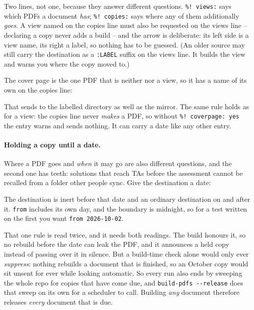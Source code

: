 Two lines, not one, because they answer different questions.
\texttt{\%! views:} says which PDFs a document \emph{has};
\texttt{\%! copies:} says where any of them additionally \emph{goes}. A view
named on the copies line must also be requested on the views line -- declaring a
copy never adds a build -- and the arrow is deliberate: its left side is a view
name, its right a label, so nothing has to be guessed. (An older source may
still carry the destination as a \texttt{:LABEL} suffix on the views line. It
builds the view and warns you where the copy moved to.)

The cover page is the one PDF that is neither  nor a view, so it
has a name of its own on the copies line:

\begin{manexsource}
\end{manexsource}

\noindent That sends  to the labelled directory as
well as the mirror. The same rule holds as for a view: the copies line never
\emph{makes} a PDF, so without \texttt{\%! coverpage: yes} the entry warns and
sends nothing. It can carry a date like any other entry.

\paragraph{Holding a copy until a date.}
Where a PDF goes and \emph{when} it may go are also different questions, and the
second one has teeth: solutions that reach TAs before the assessment cannot be
recalled from a folder other people sync. Give the destination a date:

\begin{manexsource}
\end{manexsource}

\noindent The destination is inert before that date and an ordinary destination
on and after it. \texttt{from} includes its own day, and the boundary is
midnight, so for a test written on the first you want \texttt{from 2026-10-02}.

That one rule is read twice, and it needs both readings. The build honours it,
so no rebuild before the date can leak the PDF, and it announces a held copy
instead of passing over it in silence. But a build-time check alone would only
ever \emph{suppress}: nothing rebuilds a document that is finished, so an
October copy would sit unsent for ever while looking automatic. So every run
also ends by sweeping the whole repo for copies that have come due, and
\texttt{build-pdfs -{}-release} does that sweep on its own for a scheduler to
call. Building \emph{any} document therefore releases \emph{every} document that
is due.

